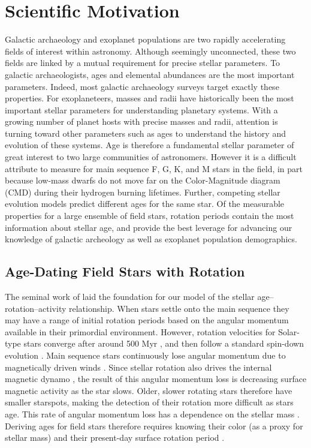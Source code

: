 \documentclass[12pt]{article}
\begin{document}
\section{Scientific Motivation}
Galactic archaeology and exoplanet populations are two rapidly accelerating
fields of interest within astronomy.
Although seemingly unconnected, these two fields are linked by a mutual
requirement for precise stellar parameters.
To galactic archaeologists, ages and elemental abundances are the most
important parameters.
Indeed, most galactic archaeology surveys target exactly these properties.
For exoplaneteers, masses and radii have historically been the most important
stellar parameters for understanding planetary systems.
With a growing number of planet hosts with precise masses and radii, attention
is turning toward other parameters such as ages to understand the history and
evolution of these systems.
Age is therefore a fundamental stellar parameter of great interest to two
large communities of astronomers.
However it is a difficult attribute to measure for main sequence F, G, K, and
M stars in the field, in part because low-mass dwarfs do not move far on the
Color-Magnitude diagram (CMD) during their hydrogen burning lifetimes.
Further, competing stellar evolution models predict different ages for the
same star.
Of the measurable properties for a large ensemble of field stars, rotation
periods contain the most information about stellar age, and provide the best
leverage for advancing our knowledge of galactic archeology as well as
exoplanet population demographics.


\subsection{Age-Dating Field Stars with Rotation}
The seminal work of \citet{skumanich1972} laid the foundation for our model of
the stellar age--rotation--activity relationship.
When stars settle onto the main sequence they may have a range of initial
rotation periods based on the angular momentum available in their primordial
environment.
However, rotation velocities for Solar-type stars converge after around 500 Myr \citep{radick1987,irwin2009b}, and then follow a standard spin-down
evolution \citep{barnes2010}.
Main sequence stars continuously lose angular momentum due to
magnetically driven winds \citep{schatzman1962, weber1967, mestel1984,
kawaler1988, Charbonneau2010}.
Since stellar rotation also drives the internal magnetic dynamo
\citep[][]{schatzman1962, Parker1970}, the result of this angular momentum
loss is decreasing surface magnetic activity as the star slows.
Older, slower rotating stars therefore have smaller starspots, making the
detection of their rotation more difficult as stars age.
This rate of angular momentum loss has a dependence on the stellar mass
\citep{noyes1984}.
Deriving ages for field stars therefore requires knowing their color (as a
proxy for stellar mass) and their present-day surface rotation period
\citep{barnes2007}.
\end{document}
